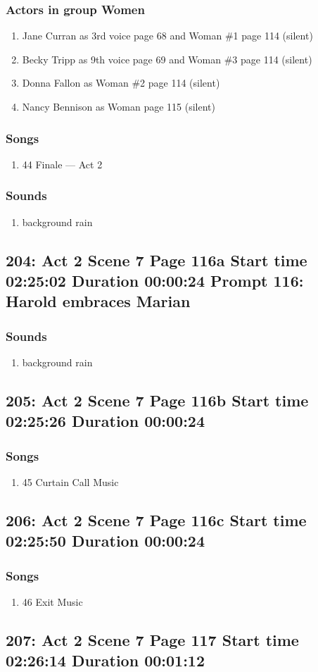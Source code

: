 \subsubsection{Actors in group Women}
\begin{enumerate}
\item Jane Curran as 3rd voice page 68 and Woman \#1 page 114 (silent)
\item Becky Tripp as 9th voice page 69 and Woman \#3 page 114 (silent)
\item Donna Fallon as Woman \#2 page 114 (silent)
\item Nancy Bennison as Woman page 115 (silent)
\end{enumerate}

\subsubsection{Songs}
\begin{enumerate}
\item 44 Finale --- Act 2
\end{enumerate}\subsubsection{Sounds}
\begin{enumerate}
\item background rain
\end{enumerate}
\subsection{204: Act 2 Scene 7 Page 116a Start time 02:25:02 Duration 00:00:24 Prompt 116: Harold embraces Marian}
\subsubsection{Sounds}
\begin{enumerate}
\item background rain
\end{enumerate}
\subsection{205: Act 2 Scene 7 Page 116b Start time 02:25:26 Duration 00:00:24}
\subsubsection{Songs}
\begin{enumerate}
\item 45 Curtain Call Music
\end{enumerate}
\subsection{206: Act 2 Scene 7 Page 116c Start time 02:25:50 Duration 00:00:24}
\subsubsection{Songs}
\begin{enumerate}
\item 46 Exit Music
\end{enumerate}
\subsection{207: Act 2 Scene 7 Page 117 Start time 02:26:14 Duration 00:01:12}

